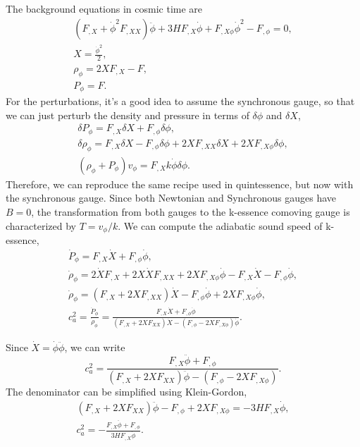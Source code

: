 \documentclass{article}
\begin{document}
The background equations in cosmic time are
\begin{align}
    ( F_{,X} + \dot\phi^2F_{,XX})\ddot\phi + 3HF_{,X}\dot\phi + F_{,X\phi}\dot\phi^2 - F_{,\phi} = 0, \\
    X = \frac{\dot\phi^2}{2}, \\
    \rho_\phi = 2XF_{,X} - F, \\
    P_\phi = F.
\end{align}
For the perturbations, it's a good idea to assume the synchronous gauge, so that we can just perturb the density and pressure in terms of $\delta\phi$ and $\delta X$,
\begin{align}
    \delta P_\phi = F_{,X}\delta X + F_{,\phi}\delta\phi, \\
    \delta \rho_\phi = F_{,X}\delta X - F_{,\phi}\delta\phi + 2XF_{,XX}\delta X + 2XF_{,X\phi}\delta\phi, \\
    (\rho_\phi + P_\phi)v_\phi = F_{,X}k\dot\phi\delta\phi.
\end{align}
Therefore, we can reproduce the same recipe used in quintessence, but now with the synchronous gauge. Since both Newtonian and Synchronous gauges have $B = 0$, the transformation from both gauges to the k-essence comoving gauge is characterized by 
$T = v_\phi/k$. We can compute the adiabatic sound speed of k-essence,
\begin{align}
    \dot P_\phi = F_{,X}\dot X + F_{,\phi}\dot\phi, \\
    \dot \rho_\phi = 2\dot X F_{,X} + 2X\dot XF_{,XX} + 2XF_{,X\phi}\dot\phi - F_{,X}\dot X - F_{,\phi}\dot\phi, \\
    \dot \rho_\phi = (F_{,X} + 2XF_{,XX})\dot X - F_{,\phi}\dot\phi + 2 XF_{,X\phi}\dot\phi, \\
    c_a^2 = \frac{\dot P_\phi}{\dot \rho_\phi} = \frac{F_{,X}\dot X + F_{,\phi}\dot\phi}{(F_{,X} + 2XF_{XX})\dot X - (F_{,\phi} - 2XF_{,X\phi})\dot\phi}.
\end{align}

Since $\dot X = \dot \phi \ddot \phi$, we can write
\begin{equation}
    c_a^2 = \frac{F_{,X}\ddot \phi + F_{,\phi}}{(F_{,X} + 2XF_{XX})\ddot \phi - (F_{,\phi} - 2XF_{,X\phi})}.
\end{equation}
The denominator can be simplified using Klein-Gordon,
\begin{align}
    (F_{,X} + 2XF_{XX})\ddot \phi - F_{,\phi} + 2XF_{,X\phi} = -3HF_{,X}\dot\phi, \\
    c_a^2 = -\frac{F_{,X}\ddot \phi + F_{,\phi}}{3HF_{,X}\dot\phi}.
\end{align}
\end{document}
